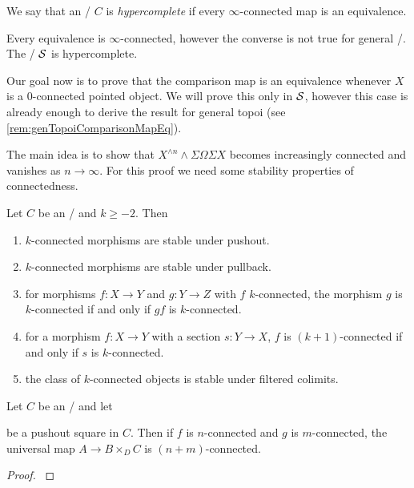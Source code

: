 \begin{definition}
    We say that an \inftytop/ $C$ is \emph{hypercomplete} if every $\infty$-connected map is an equivalence.
\end{definition}
\begin{remark}
    Every equivalence is $\infty$-connected, however the converse is not true for general \inftytops/.
    The \inftytop/ $\mathcal{S}$ is hypercomplete. %
\end{remark}
Our goal now is to prove that the comparison map is an equivalence whenever $X$ is a $0$-connected pointed object.
We will prove this only in $\mathcal{S}$, however this case is already enough to derive the result for general topoi (see \cref{rem:genTopoiComparisonMapEq}).

The main idea is to show that $X^{\wedge n}\wedge\Sigma\Omega\Sigma X$ becomes increasingly connected and vanishes as $n\to\infty$.
For this proof we need some stability properties of connectedness.
\begin{prop}\label{prop:conn}
    Let $C$ be an \inftytop/ and $k\geq -2$.
    Then
    \begin{enumerate}[label={(\roman*)}]
        \item $k$-connected morphisms are stable under pushout. \label{prop:connStableUnderPo}
        \item $k$-connected morphisms are stable under pullback.\label{prop:connStableUnderPb}
        \item for morphisms $f\colon X\to Y$ and $g\colon Y\to Z$ with $f$ $k$-connected, the morphism $g$ is $k$-connected if and only if $gf$ is $k$-connected. \label{prop:connRightCancel}
        \item for a morphism $f\colon X\to Y$ with a section $s\colon Y\to X$, $f$ is $(k+1)$-connected if and only if $s$ is $k$-connected. \label{prop:connSection}
        \item the class of $k$-connected objects is stable under filtered colimits. \label{prop:connStableFilteredColim}
    \end{enumerate}
    \begin{reference}
        \cite[Proposition 4.10]{splittings_21}
    \end{reference}
\end{prop}
\begin{prop}\label{prop:blakersMassay}
    Let $C$ be an \inftytop/ and let 
    \begin{center}
    \end{center}
    be a pushout square in $C$.
    Then if $f$ is $n$-connected and $g$ is $m$-connected, the universal map $A\to B\times_{D}C$ is $(n+m)$-connected.
    \begin{proof}
        \cite[Corollary 4.3.1]{gen_blakers_massey}
    \end{proof}
\end{prop}
